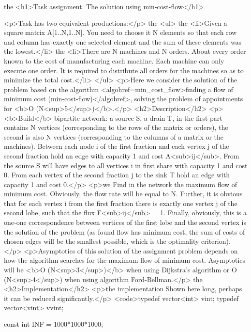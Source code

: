the <h1>Task assignment. The solution using min-cost-flow</h1>

<p>Task has two equivalent productions:</p>
the <ul>
the <li>Given a square matrix A[1..N,1..N]. You need to choose it N elements so that each row and column has exactly one selected element and the sum of these elements was the lowest.</li>
the <li>There are N machines and N orders. About every order known to the cost of manufacturing each machine. Each machine can only execute one order. It is required to distribute all orders for the machines so as to minimize the total cost.</li>
</ul>
<p>Here we consider the solution of the problem based on the algorithm <algohref=min_cost_flow>finding a flow of minimum cost (min-cost-flow)</algohref>, solving the problem of appointments for <b>O (N<sup>5</sup>)</b>.</p>
<h2>Description</h2>
<p><b>Build</b> bipartite network: a source S, a drain T, in the first part contains N vertices (corresponding to the rows of the matrix or orders), the second is also N vertices (corresponding to the columns of a matrix or the machines). Between each node i of the first fraction and each vertex j of the second fraction hold an edge with capacity 1 and cost A<sub>ij</sub>. From the source S will have edges to all vertices i in first share with capacity 1 and cost 0. From each vertex of the second fraction j to the sink T hold an edge with capacity 1 and cost 0.</p>
<p>we Find in the network the maximum flow of minimum cost. Obviously, the flow rate will be equal to N. Further, it is obvious that for each vertex i from the first fraction there is exactly one vertex j of the second lobe, such that the flux F<sub>ij</sub> = 1. Finally, obviously, this is a one-one correspondence between vertices of the first lobe and the second vertex is the solution of the problem (as found flow has minimum cost, the sum of costs of chosen edges will be the smallest possible, which is the optimality criterion).</p>
<p>Asymptotics of this solution of the assignment problem depends on how the algorithm searches for the maximum flow of minimum cost. Asymptotics will be <b>O (N<sup>3</sup>)</b> when using Dijkstra's algorithm or O (N<sup>4</sup>) when using algorithm Ford-Bellman.</p>
the <h2>Implementation</h2>
<p>the implementation Shown here long, perhaps it can be reduced significantly.</p>
<code>typedef vector<int> vint;
typedef vector<vint> vvint;

const int INF = 1000*1000*1000;


